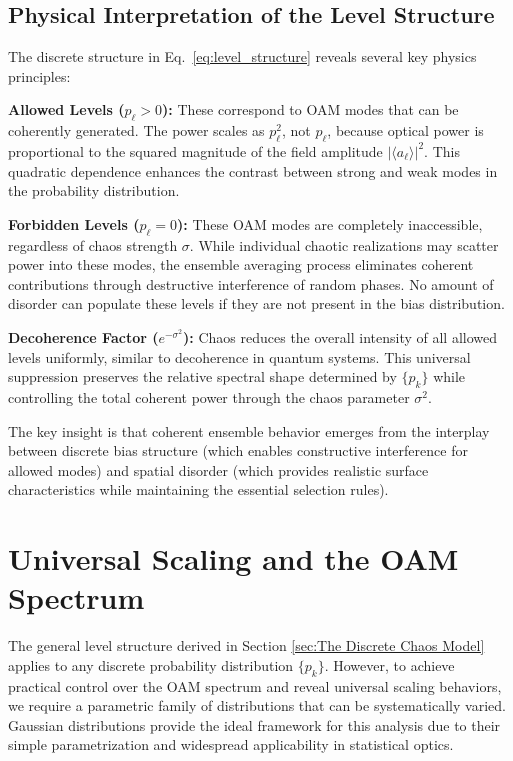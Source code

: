 \documentclass[a4paper,12pt]{article}
\newcommand{\ev}[1]{\langle #1 \rangle}
\begin{document}
\subsection{Physical Interpretation of the Level Structure}

The discrete structure in Eq.~\ref{eq:level_structure} reveals several key physics principles:

\textbf{Allowed Levels ($p_\ell > 0$):} These correspond to OAM modes that can be coherently generated. The power scales as $p_\ell^2$, not $p_\ell$, because optical power is proportional to the squared magnitude of the field amplitude $|\ev{a_\ell}|^2$. This quadratic dependence enhances the contrast between strong and weak modes in the probability distribution.

\textbf{Forbidden Levels ($p_\ell = 0$):} These OAM modes are completely inaccessible, regardless of chaos strength $\sigma$. While individual chaotic realizations may scatter power into these modes, the ensemble averaging process eliminates coherent contributions through destructive interference of random phases. No amount of disorder can populate these levels if they are not present in the bias distribution.

\textbf{Decoherence Factor ($e^{-\sigma^2}$):} Chaos reduces the overall intensity of all allowed levels uniformly, similar to decoherence in quantum systems. This universal suppression preserves the relative spectral shape determined by $\{p_k\}$ while controlling the total coherent power through the chaos parameter $\sigma^2$.

The key insight is that coherent ensemble behavior emerges from the interplay between discrete bias structure (which enables constructive interference for allowed modes) and spatial disorder (which provides realistic surface characteristics while maintaining the essential selection rules).


\section{Universal Scaling and the OAM Spectrum}

The general level structure derived in Section \ref{sec:The Discrete Chaos Model} applies to any discrete probability distribution $\{p_k\}$. However, to achieve practical control over the OAM spectrum and reveal universal scaling behaviors, we require a parametric family of distributions that can be systematically varied. Gaussian distributions provide the ideal framework for this analysis due to their simple parametrization and widespread applicability in statistical optics.
\end{document}
